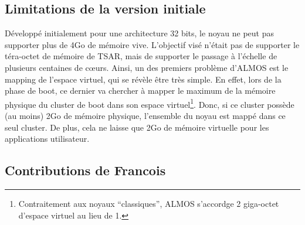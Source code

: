 

    \subsection{Limitations de la version initiale}

      Développé initialement pour une architecture 32 bits, le noyau ne peut pas
      supporter plus de 4Go de mémoire vive. L'objectif visé n'était pas de
      supporter le téra-octet de mémoire de TSAR, mais de supporter le passage à
      l'échelle de plusieurs centaines de c\oe urs. Ainsi, un des premiers
      problème d'ALMOS est le mapping de l'espace virtuel, qui se révèle être
      très simple. En effet, lors de la phase de boot, ce dernier va chercher à
      mapper le maximum de la mémoire physique du cluster de boot dans son
      espace virtuel\footnote{Contraitement aux noyaux ``classiques'', ALMOS
        s'accordge 2 giga-octet d'espace virtuel au lieu de 1.}. Donc, si ce
      cluster possède (au moins) 2Go de mémoire physique, l'ensemble du noyau
      est mappé dans ce seul cluster. De plus, cela ne laisse que 2Go de mémoire
      virtuelle pour les applications utilisateur.


    \subsection{Contributions de Francois \citeauthor{guerret2014exploitation}}


